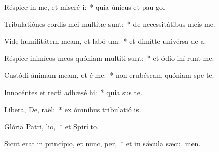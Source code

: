 \item Réspice in me, et miseré i:~* quia únicus et pau  go.
\item Tribulatiónes cordis mei multitæ sunt:~* de necessitátibus meis  me.
\item Vide humilitátem meam, et labó um:~* et dimítte univérsa de a.
\item Réspice inimícos meos quóniam multiti sunt:~* et ódio iní runt me.
\item Custódi ánimam meam, et é me:~* non erubéscam quóniam spe  te.
\item Innocéntes et recti adhæsé hi:~* quia sus te.
\item Líbera, De, raël:~* ex ómnibus tribulatió is.
\item Glória Patri,  lio,~* et Spirí to.
\item Sicut erat in princípio, et nunc,  per,~* et in sǽcula sæcu. men.
